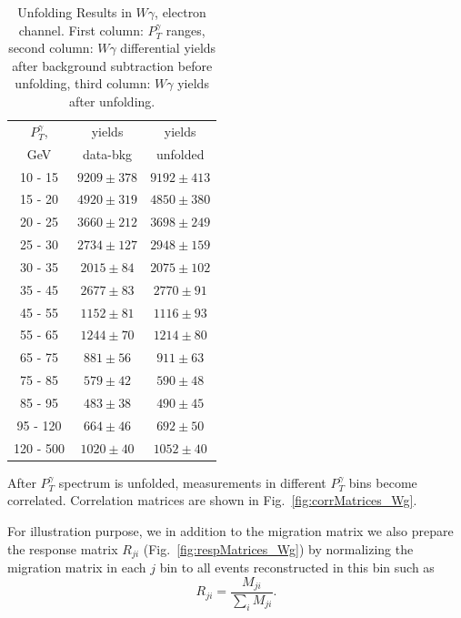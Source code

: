\begin{table}[h]
  \scriptsize
  \begin{center}
  \caption{Unfolding Results in $W\gamma$, electron channel. First column: $P_T^{\gamma}$ ranges, second column: $W\gamma$ differential yields after background subtraction before unfolding, third column: $W\gamma$ yields after unfolding.}
  \begin{tabular}{|c|c|c|}

  $P_T^{\gamma}$, &  yields   &   yields  \\ 
  GeV           &  data-bkg & unfolded  \\ \hline

 10 -  15 &     $9209\pm 378$ &     $9192\pm 413$  \\ \hline
 15 -  20 &     $4920\pm 319$ &     $4850\pm 380$  \\ \hline
 20 -  25 &     $3660\pm 212$ &     $3698\pm 249$  \\ \hline
 25 -  30 &     $2734\pm 127$ &     $2948\pm 159$  \\ \hline
 30 -  35 &     $2015\pm  84$ &     $2075\pm 102$  \\ \hline
 35 -  45 &     $2677\pm  83$ &     $2770\pm  91$  \\ \hline
 45 -  55 &     $1152\pm  81$ &     $1116\pm  93$  \\ \hline
 55 -  65 &     $1244\pm  70$ &     $1214\pm  80$  \\ \hline
 65 -  75 &     $881\pm  56$ &     $911\pm  63$  \\ \hline
 75 -  85 &     $579\pm  42$ &     $590\pm  48$  \\ \hline
 85 -  95 &     $483\pm  38$ &     $490\pm  45$  \\ \hline
 95 - 120 &     $664\pm  46$ &     $692\pm  50$  \\ \hline
120 - 500 &     $1020\pm  40$ &     $1052\pm  40$  \\ \hline
  \end{tabular}
  \label{tab:unf_results_ELECTRON_WGamma}
  \end{center}
\end{table}

After $P_T^{\gamma}$ spectrum is unfolded, measurements in different $P_T^{\gamma}$ bins become correlated. Correlation matrices are shown in Fig.~\ref{fig:corrMatrices_Wg}. 

For illustration purpose, we in addition to the migration matrix we also prepare the response matrix $R_{ji}$ (Fig.~\ref{fig:respMatrices_Wg}) by normalizing the migration matrix in each $j$ bin to all events reconstructed in this bin such as 
\begin{equation}
R_{ji} = \frac{M_{ji}}{\sum_{i} M_{ji}}. 
\end{equation}

